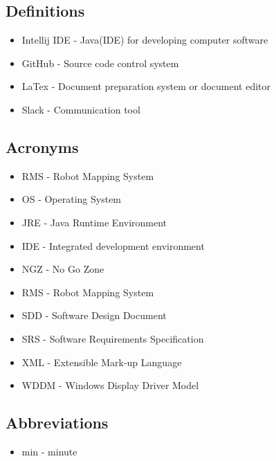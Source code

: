 \subsection{Definitions}
\begin{itemize}
\item Intellij IDE - Java(IDE) for developing computer software
\item GitHub - Source code control system
\item LaTex - Document preparation system or document editor 
\item Slack - Communication tool
\end{itemize}

\subsection{Acronyms}
\begin{itemize}
\item RMS - Robot Mapping System
\item OS - Operating System
\item JRE - Java Runtime Environment
\item IDE - Integrated development environment
\item NGZ - No Go Zone
\item RMS - Robot Mapping System
\item SDD - Software Design Document
\item SRS - Software Requirements Specification
\item XML - Extensible Mark-up Language
\item WDDM - Windows Display Driver Model
\end{itemize}

\subsection{Abbreviations}
\begin{itemize}
	\item min - minute
\end{itemize}
